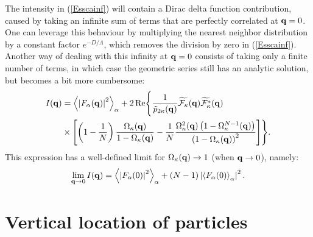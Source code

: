 The intensity in (\ref{Esscainf}) will contain a Dirac delta function contribution, caused by taking an infinite sum of terms that are perfectly correlated at $\mathbf{q} = 0$. One can leverage this behaviour by multiplying the nearest neighbor distribution by a constant factor $e^{-D/\Lambda}$, which removes the division by zero in (\ref{Esscainf}).
Another way of dealing with this infinity at $\mathbf{q} =0$ consists of taking only a finite number of terms, in which case the geometric series still has an analytic solution, but becomes a bit more cumbersome:
\begin{equation*}
\begin{split}
  I(\mathbf{q} ) &= {\left\langle\left| F_\alpha(\mathbf{q} ) \right| ^2\right\rangle}_\alpha
   + 2 \operatorname{Re} \Biggl\lbrace \frac{1}{\tilde{p}_{2\kappa}(\mathbf{q} )}\widetilde{\mathcal{F}_\kappa}(\mathbf{q} )\widetilde{\mathcal{F}_\kappa^*}(\mathbf{q} ) \\
  & \times \left[ \left( 1 - \frac{1}{N}\right) \frac{\Omega_\kappa(\mathbf{q} )}{1 - \Omega_\kappa(\mathbf{q} ) } - \frac{1}{N}\frac{\Omega_\kappa^2(\mathbf{q} )\left( 1- \Omega_\kappa^{N-1}(\mathbf{q} )\right) }{\left( 1 - \Omega_\kappa(\mathbf{q} ) \right) ^2 } \right] \Biggr\rbrace.
\end{split}
\end{equation*}
This expression has a well-defined limit for $\Omega_\kappa(\mathbf{q} ) \rightarrow 1$ (when $\mathbf{q} \rightarrow 0$), namely:
\begin{equation*}
  \lim_{\mathbf{q} \rightarrow 0} I(\mathbf{q} ) = {\left\langle\left| F_\alpha(0 ) \right| ^2\right\rangle}_{\alpha} + \left( N-1 \right) \left| {\left\langle F_\alpha(0 )\right\rangle}_{\alpha} \right|^2.
\end{equation*}


\section{Vertical location of particles}


